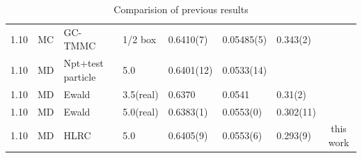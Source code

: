 \documentclass[aps,pre,preprint]{revtex4}
\begin{document}
\begin{table}
\begin{tabular*}{0.99\textwidth}{@{\extracolsep{\fill}}cclllllc}
    1.10 & MC & GC-TMMC & 1/2 box & 0.6410(7) & 0.05485(5) & 0.343(2) & \cite{errington2003evaluating}\\
    1.10 & MD & Npt+test particle & 5.0 & 0.6401(12) & 0.0533(14) && \cite{lotfi1992vapour}\\
    1.10 & MD & Ewald & 3.5(real) & 0.6370 & 0.0541 & 0.31(2) & \cite{lopez2002thermodynamic}\\
    1.10 & MD & Ewald & 5.0(real) & 0.6383(1) & 0.0553(0) & 0.302(11) & \cite{ismail2007application}\\
    1.10 & MD & HLRC & 5.0 & 0.6405(9) & 0.0553(6) & 0.293(9) & this work\\
    \hline\hline
  \end{tabular*}
  \caption{Comparision of previous results}
  \label{tab:tmp5}
\end{table}


{}

\end{document}
